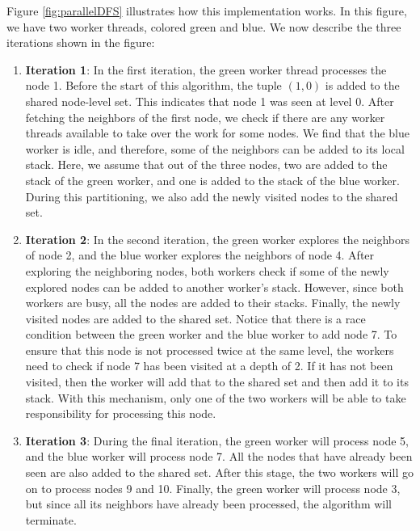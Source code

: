 Figure \ref{fig:parallelDFS} illustrates how this implementation works.
In this figure, we have
two worker threads, colored green and blue. We now describe the three iterations
shown in the figure:
\begin{enumerate}
    \item \textbf{Iteration 1}: In the first iteration, the green worker thread
        processes the node 1. Before the start of this
        algorithm, the tuple $(1,0)$ is added to the shared node-level
        set. This indicates that node 1 was seen at level 0. After
        fetching the neighbors of the first node, we check if there are any
        worker threads available to take over the work for some nodes. We find
        that the blue worker is idle, and therefore, some of the
        neighbors can be added to its local stack. Here, we assume that out of
        the three nodes, two are added to the stack of the green worker, and one
        is added to the stack of the blue worker. During this partitioning, we
        also add the newly visited nodes to the shared set. 
    \item \textbf{Iteration 2}: In the second iteration, the green worker
        explores the neighbors of node 2, and the blue worker
        explores the neighbors of node 4. After exploring the
        neighboring nodes, both workers check if some of the newly
        explored nodes can be added to another worker's stack. However, since
        both workers are busy, all the nodes are added to their stacks.
        Finally, the newly visited nodes are added
        to the shared set. Notice that there is a race condition between the
        green worker and the blue worker to add node 7. To ensure that
        this node is not processed twice at the same level, the workers need to
        check if node 7 has been visited at a depth of 2. If it has not been
        visited, then the worker will add that to the shared set and then add it
        to its stack. With this mechanism, only one of the two workers will be
        able to take responsibility for processing this node.
    \item \textbf{Iteration 3}: During the final iteration, the green worker
        will process node 5, and the blue worker will process node 7. All the
        nodes that have already been seen are also added to the shared set.
        After this stage, the two workers will go on to process nodes 9 and 10.
        Finally, the green worker will process node 3, but since all its
        neighbors have already been processed, the algorithm will terminate.
\end{enumerate}
